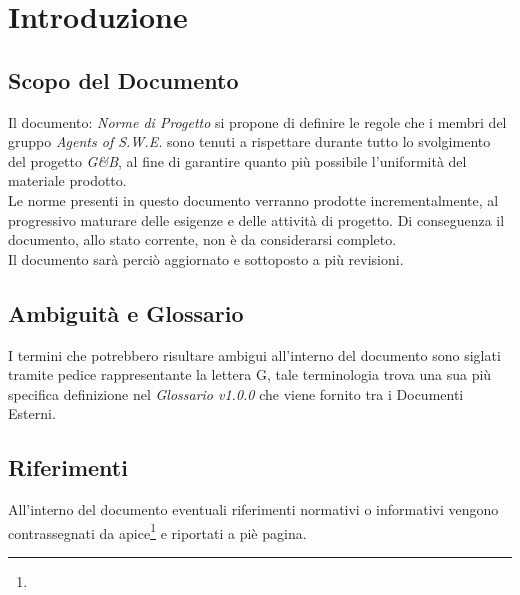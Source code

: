 \section{Introduzione}

\subsection{Scopo del Documento}
Il documento: \textit{Norme di Progetto} si propone di definire le regole che i membri del gruppo \textit{Agents of S.W.E.} sono tenuti a rispettare durante tutto lo svolgimento del progetto \textit{G\&B}, al fine di garantire quanto più possibile l'uniformità del materiale prodotto.\\
Le norme presenti in questo documento verranno prodotte incrementalmente, al progressivo maturare delle esigenze e delle attività di progetto. Di conseguenza il documento, allo stato corrente, non è da considerarsi completo.\\
Il documento sarà perciò aggiornato e sottoposto a più revisioni.

\subsection{Ambiguità e Glossario}
I termini che potrebbero risultare ambigui all'interno del documento sono siglati tramite pedice rappresentante la lettera \textmd{G}, tale terminologia trova una sua più specifica definizione nel \textit{Glossario v1.0.0} che viene fornito tra i Documenti Esterni.

\subsection{Riferimenti}
All'interno del documento eventuali riferimenti normativi o informativi vengono contrassegnati da apice\footnote{} e riportati a piè pagina.